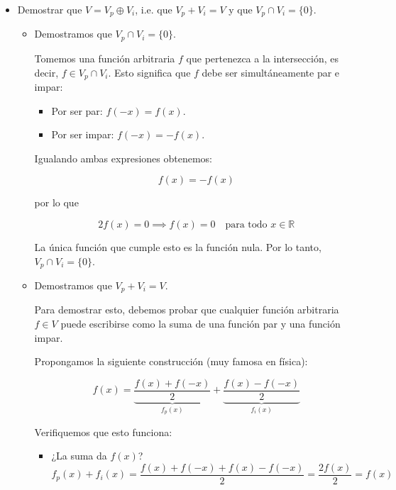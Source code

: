 \documentclass[11pt,spanish]{article}
\begin{document}
\begin{itemize}
\begin{itemize}
\item Clausura bajo el producto por escalar: Sea $f \in V_i$ y $\alpha \in \mathbb{R}$.

$$(\alpha f)(-x) = \alpha \cdot f(-x) = \alpha \cdot (-f(x)) = -(\alpha f)(x)$$

Por lo tanto, $\alpha f \in V_i$.

\end{itemize}

Al cumplir las tres condiciones, concluimos $V_i$ es un subespacio de $V$.

\item  Demostrar que $V=V_p\oplus V_i$, i.e. que $V_p + V_i = V$ y que $V_p \cap V_i = \{0\}$.

\begin{itemize}

\item Demostramos que $V_p \cap V_i = \{0\}$.

Tomemos una función arbitraria $f$ que pertenezca a la intersección, es decir, $f \in V_p \cap V_i$.
Esto significa que $f$ debe ser simultáneamente par e impar:

\begin{itemize}
\item Por ser par: $f(-x) = f(x)$.
\item Por ser impar: $f(-x) = -f(x)$.
\end{itemize}

Igualando ambas expresiones obtenemos:

$$f(x) = -f(x)$$

por lo que

$$2f(x) = 0 \implies f(x) = 0 \quad \text{para todo } x \in \mathbb{R}$$

La única función que cumple esto es la función nula. Por lo tanto, $V_p \cap V_i = \{0\}$.

\item  Demostramos que $V_p + V_i = V$.

Para demostrar esto, debemos probar que cualquier función arbitraria $f \in V$ puede escribirse como la suma de una función par y una función impar.

Propongamos la siguiente construcción (muy famosa en física):

$$
f(x) = \underbrace{\frac{f(x) + f(-x)}{2}}_{f_p(x)} + \underbrace{\frac{f(x) - f(-x)}{2}}_{f_i(x)}
$$

Verifiquemos que esto funciona:

\begin{itemize}
\item ¿La suma da $f(x)$?
$$f_p(x) + f_i(x) = \frac{f(x) + f(-x) + f(x) - f(-x)}{2} = \frac{2f(x)}{2} = f(x)$$


\end{itemize}
\end{itemize}
\end{itemize}
\end{document}

